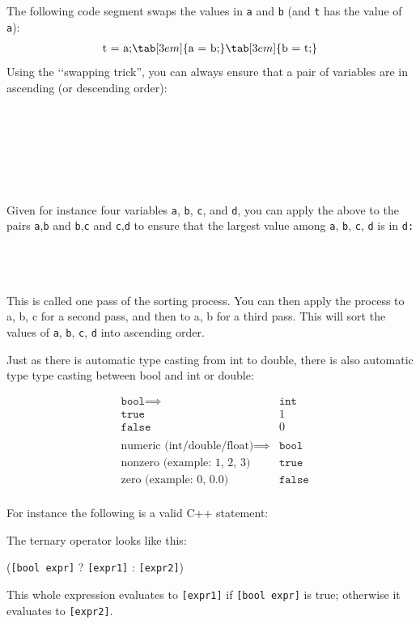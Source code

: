 The following code segment swaps the values in \texttt{a} and \texttt{b}
(and \texttt{t} has the value of \texttt{a}):
\begin{align*}
&\text{t = a;} \tab[3em]{\text{a = b;}} \tab[3em]{\text{b = t;}}\\
\end{align*}
Using the \lq\lq swapping trick'', you can always ensure that a pair of
variables are in ascending (or descending order):

\\
\tab[3em]{\{}\\
\\
\\
\\
\tab[3em]{\}}\\

Given for instance four variables \texttt{a}, \texttt{b}, \texttt{c}, and
\texttt{d}, you can apply the above to the pairs \texttt{a},\texttt{b} and
\texttt{b},\texttt{c} and \texttt{c},\texttt{d} to ensure that the largest value
among \texttt{a}, \texttt{b}, \texttt{c}, \texttt{d} is in \texttt{d:}

\\
\\
\\

This is called one pass of the sorting process. You can then apply the
process to a, b, c for a second pass, and then to a, b for a third pass.
This will sort the values of \texttt{a}, \texttt{b}, \texttt{c}, \texttt{d} into
ascending order.

Just as there is automatic type casting from int to double, there is
also automatic type type casting between bool and int or double:

\begin{align*}
&\texttt{bool} \implies &\texttt{int}\\
&\texttt{true} &1\\
&\texttt{false} &0\\\\
&\text{numeric (int/double/float)} \implies &\texttt{bool}\\
&\text{nonzero (example: 1, 2, 3)} &\texttt{true}\\
&\text{zero (example: 0, 0.0)} &\texttt{false}\\
\end{align*}

For instance the following is a valid C++ statement:

The ternary operator looks like this:
\begin{center}
(\texttt{[bool expr]} ? \texttt{[expr1]} : \texttt{[expr2]})
\end{center}
This whole expression evaluates to \texttt{[expr1]} if \texttt{[bool
expr]} is true; otherwise it evaluates to \texttt{[expr2]}.

